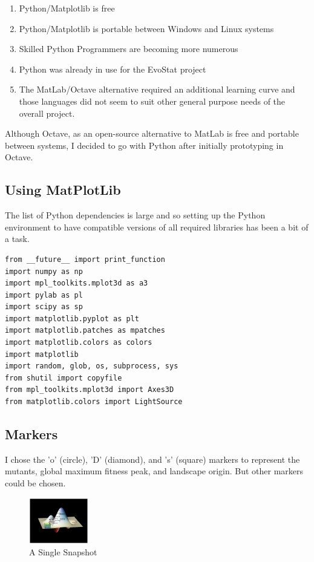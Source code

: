 \documentclass[10pt,letterpaper]{article}
\begin{document}
\begin{enumerate}[itemsep=1pt, topsep=2pt, partopsep=0pt]
\item Python/Matplotlib is free
\item Python/Matplotlib is portable between Windows and Linux systems
\item Skilled Python Programmers are becoming more numerous
\item Python was already in use for the EvoStat project
\item The MatLab/Octave alternative required an additional learning curve and those languages did not seem to suit other general purpose needs of the overall project.
\end{enumerate}
Although Octave, as an open-source alternative to MatLab is free and portable between systems, I decided to go with Python after initially prototyping in Octave.

\subsection*{Using MatPlotLib}
The list of Python dependencies is large and so setting up the Python environment to have compatible versions of all required libraries has been a bit of a task.
\begin{verbatim}
from __future__ import print_function
import numpy as np
import mpl_toolkits.mplot3d as a3
import pylab as pl
import scipy as sp
import matplotlib.pyplot as plt
import matplotlib.patches as mpatches
import matplotlib.colors as colors
import matplotlib
import random, glob, os, subprocess, sys
from shutil import copyfile
from mpl_toolkits.mplot3d import Axes3D
from matplotlib.colors import LightSource
\end{verbatim}

\subsection*{Markers}
I chose the 'o' (circle), 'D' (diamond), and 's' (square) markers to represent the mutants, global maximum fitness peak, and landscape origin. But other markers could be chosen.

\begin{figure}
\centering
\includegraphics[width=0.23\textwidth,scale=0.2]{fitness.png}
\caption{\label{fig:reticules}A Single Snapshot}
\end{figure}
\end{document}
